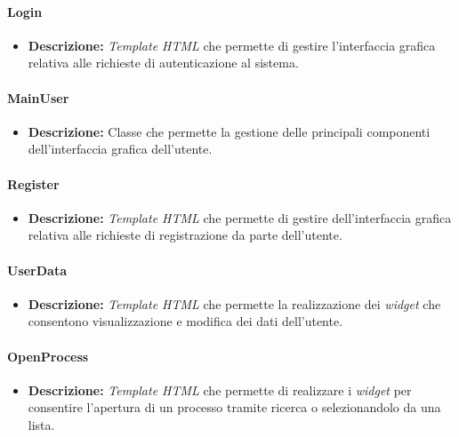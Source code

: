 \paragraph{Login}
\begin{itemize}
\item \textbf{Descrizione:} \textit{Template HTML} che permette di gestire l'interfaccia grafica relativa alle richieste di autenticazione al sistema.
\end{itemize}

\paragraph{MainUser}
\begin{itemize}
\item \textbf{Descrizione:} Classe che permette la gestione delle principali componenti dell'interfaccia grafica dell'utente.
\end{itemize}

\paragraph{Register}
\begin{itemize}
\item \textbf{Descrizione:} \textit{Template HTML} che permette di gestire dell'interfaccia grafica relativa alle richieste di registrazione da parte dell'utente.
\end{itemize}

\paragraph{UserData}
\begin{itemize}
\item \textbf{Descrizione:} \textit{Template HTML} che permette la realizzazione dei \textit{widget} che consentono visualizzazione e modifica dei dati dell'utente.
\end{itemize}

\paragraph{OpenProcess}
\begin{itemize}
\item \textbf{Descrizione:} \textit{Template HTML} che permette di realizzare i \textit{widget} per consentire l'apertura di un processo tramite ricerca o selezionandolo da una lista.
\end{itemize}

